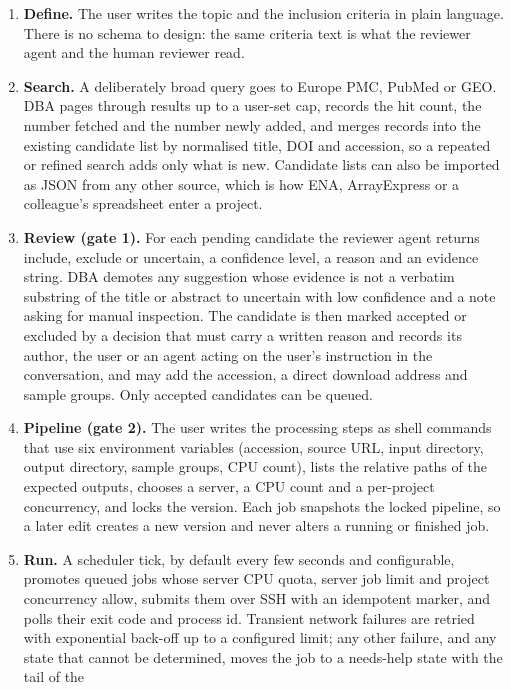\documentclass[11pt,a4paper]{article}
\providecommand{\tightlist}{\setlength{\itemsep}{0pt}\setlength{\parskip}{0pt}}
\begin{document}
\begin{enumerate}
\def\labelenumi{\arabic{enumi}.}
\tightlist
\item
  \textbf{Define.} The user writes the topic and the inclusion criteria
  in plain language. There is no schema to design: the same criteria
  text is what the reviewer agent and the human reviewer read.
\item
  \textbf{Search.} A deliberately broad query goes to Europe PMC, PubMed
  or GEO. DBA pages through results up to a user-set cap, records the
  hit count, the number fetched and the number newly added, and merges
  records into the existing candidate list by normalised title, DOI and
  accession, so a repeated or refined search adds only what is new.
  Candidate lists can also be imported as JSON from any other source,
  which is how ENA, ArrayExpress or a colleague's spreadsheet enter a
  project.
\item
  \textbf{Review (gate 1).} For each pending candidate the reviewer
  agent returns include, exclude or uncertain, a confidence level, a
  reason and an evidence string. DBA demotes any suggestion whose
  evidence is not a verbatim substring of the title or abstract to
  uncertain with low confidence and a note asking for manual inspection.
  The candidate is then marked accepted or excluded by a decision that
  must carry a written reason and records its author, the user or an
  agent acting on the user's instruction in the conversation, and may
  add the accession, a direct download address and sample groups. Only
  accepted candidates can be queued.
\item
  \textbf{Pipeline (gate 2).} The user writes the processing steps as
  shell commands that use six environment variables (accession, source
  URL, input directory, output directory, sample groups, CPU count),
  lists the relative paths of the expected outputs, chooses a server, a
  CPU count and a per-project concurrency, and locks the version. Each
  job snapshots the locked pipeline, so a later edit creates a new
  version and never alters a running or finished job.
\item
  \textbf{Run.} A scheduler tick, by default every few seconds and
  configurable, promotes queued jobs whose server CPU quota, server job
  limit and project concurrency allow, submits them over SSH with an
  idempotent marker, and polls their exit code and process id. Transient
  network failures are retried with exponential back-off up to a
  configured limit; any other failure, and any state that cannot be
  determined, moves the job to a needs-help state with the tail of the

\end{enumerate}
\end{document}
